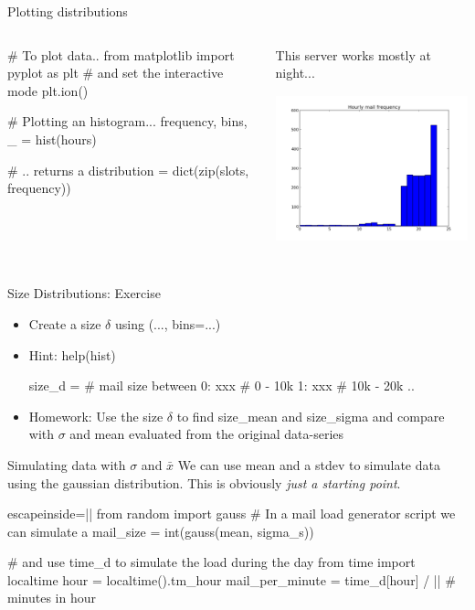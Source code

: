 \begin{pyframe}{Plotting distributions}
\begin{columns}
\begin{pycode}
# To plot data..
from matplotlib import pyplot as plt
# and set the interactive mode
plt.ion()

# Plotting an histogram... 
frequency, bins, _ = hist(hours)

# .. returns a 
distribution = dict(zip(slots, 
    frequency))
\end{pycode}
This server works mostly at night...
\includegraphics[width=6cm,height=5cm]{hourly_mail_d.pdf}
\end{columns}
\end{pyframe}

\begin{pyframe}{Size Distributions: Exercise}
\begin{itemize}
\item Create a size $\delta$ using (..., bins=...)
\item Hint: help(hist)
\begin{pycode}
size_d = {  # mail size between
    0: xxx  #  0 - 10k
    1: xxx  #  10k - 20k
    ..
    }
\end{pycode}
\item Homework: Use the size $\delta$ to find size\_mean and size\_sigma and compare with $\sigma$ and mean evaluated from the original data-series
\end{itemize}
\end{pyframe}



\begin{pyframe}{Simulating data with $\sigma$ and $\bar{x}$}
We can use  mean and a stdev to simulate data using the gaussian distribution.
This is obviously \emph{just a starting point}.
\begin{pycode*}{escapeinside=||}
from random import gauss
# In a mail load generator script we can simulate a
mail_size = int(gauss(mean, sigma_s))

# and use time_d to simulate the load during the day
from time import localtime
hour = localtime().tm_hour
mail_per_minute = time_d[hour] / || # minutes in hour
\end{pycode*}
\end{pyframe}



